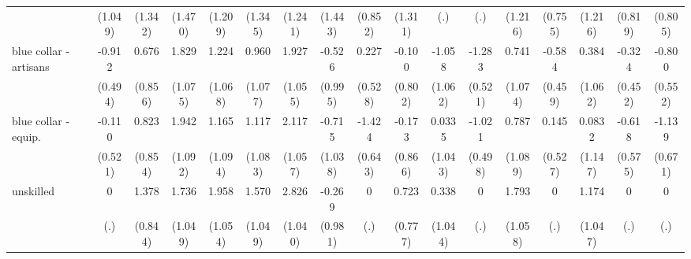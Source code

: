 {\begin{tabular}{l*{16}{c}}
                    &     (1.049)         &     (1.342)         &     (1.470)         &     (1.209)         &     (1.345)         &     (1.241)         &     (1.443)         &     (0.852)         &     (1.311)         &         (.)         &         (.)         &     (1.216)         &     (0.755)         &     (1.216)         &     (0.819)         &     (0.805)         \\
[1em]
blue collar - artisans&      -0.912         &       0.676         &       1.829         &       1.224         &       0.960         &       1.927         &      -0.526         &       0.227         &      -0.100         &      -1.058         &      -1.283\sym{*}  &       0.741         &      -0.584         &       0.384         &      -0.324         &      -0.800         \\
                    &     (0.494)         &     (0.856)         &     (1.075)         &     (1.068)         &     (1.077)         &     (1.055)         &     (0.995)         &     (0.528)         &     (0.802)         &     (1.062)         &     (0.521)         &     (1.074)         &     (0.459)         &     (1.062)         &     (0.452)         &     (0.552)         \\
[1em]
blue collar - equip.&      -0.110         &       0.823         &       1.942         &       1.165         &       1.117         &       2.117\sym{*}  &      -0.715         &      -1.424\sym{*}  &      -0.173         &      0.0335         &      -1.021\sym{*}  &       0.787         &       0.145         &      0.0832         &      -0.618         &      -1.139         \\
                    &     (0.521)         &     (0.854)         &     (1.092)         &     (1.094)         &     (1.083)         &     (1.057)         &     (1.038)         &     (0.643)         &     (0.866)         &     (1.043)         &     (0.498)         &     (1.089)         &     (0.527)         &     (1.147)         &     (0.575)         &     (0.671)         \\
[1em]
unskilled           &           0         &       1.378         &       1.736         &       1.958         &       1.570         &       2.826\sym{**} &      -0.269         &           0         &       0.723         &       0.338         &           0         &       1.793         &           0         &       1.174         &           0         &           0         \\
                    &         (.)         &     (0.844)         &     (1.049)         &     (1.054)         &     (1.049)         &     (1.040)         &     (0.981)         &         (.)         &     (0.777)         &     (1.044)         &         (.)         &     (1.058)         &         (.)         &     (1.047)         &         (.)         &         (.)         \\

\end{tabular}}
